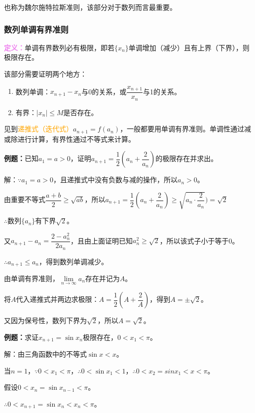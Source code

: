 \documentclass[UTF8, 12pt]{ctexart}
\begin{document}
也称为魏尔施特拉斯准则，该部分对于数列而言最重要。

\subsubsection{数列单调有界准则}

\textcolor{violet}{\textbf{定义：}}单调有界数列必有极限，即若$\{x_n\}$单调增加（减少）且有上界（下界），则极限存在。

该部分需要证明两个地方：

\begin{enumerate}
    \item 数列单调：$x_{n+1}-x_n$与0的关系，或$\dfrac{x_{n+1}}{x_n}$与1的关系。
    \item 有界：$\vert x_n\vert\leqslant M$是否存在。
\end{enumerate}

见到\textcolor{orange}{递推式（迭代式）}$a_{n+1}=f(a_n)$，一般都要用单调有界准则。单调性通过减或除进行计算，有界性通过不等式来计算。

\textbf{例题：}已知$a_1=a>0$，证明$a_{n+1}=\dfrac{1}{2}\left(a_n+\dfrac{2}{a_n}\right)$的极限存在并求出。

解：$\because a_1=a>0$，且递推式中没有负数与减的操作，所以$a_n>0$。

由重要不等式$\dfrac{a+b}{2}\geqslant\sqrt{ab}$，所以$a_{n+1}=\dfrac{1}{2}\left(a_n+\dfrac{2}{a_n}\right)\geqslant\sqrt{a_n\cdot\dfrac{2}{a_n}})=\sqrt{2}$

$\therefore$数列$\{a_n\}$有下界$\sqrt{2}$。

又$a_{n+1}-a_n=\dfrac{2-a_n^2}{2a_n}$，且由上面证明已知$a_n^2\geqslant\sqrt{2}$，所以该式子小于等于0。

$\therefore a_{n+1}\leqslant a_n$，得到数列单调减少。

由单调有界准则，$\lim\limits_{n\to\infty}a_n$存在并记为$A$。

将$A$代入递推式并两边求极限：$A=\dfrac{1}{2}(A+\dfrac{2}{A})$，得到$A=\pm\sqrt{2}$。

又因为保号性，数列下界为$\sqrt{2}$，所以$A=\sqrt{2}$。

\textbf{例题：}求证$x_{n+1}=\sin x_n$极限存在，$0<x_1<\pi$。

解：由三角函数中的不等式$\sin x<x$。

当$n=1$，$\because 0<x_1<\pi$，$\therefore 0<\sin x_1<1$，$\therefore 0<x_2=sin x_1<x<\pi$。

假设$0<x_n=\sin x_{n-1}<\pi$。

$\therefore 0<x_{n+1}=\sin x_n<x_n<\pi$。
\end{document}

